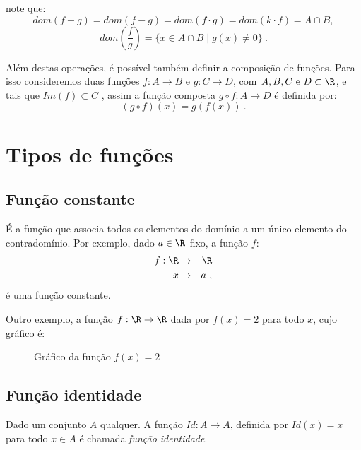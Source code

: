 note que:
\[dom(f+g)= dom(f-g)= dom(f \cdot g)= dom(k \cdot f)= A \cap B ,\]
\[ dom\left( \frac{f}{g} \right)= \{x \in A \cap B \mid g(x) \neq 0\} \ . \]

Além destas operações, é possível também definir a composição de funções. Para isso consideremos duas funções $f: A \rightarrow B$ e $g: C \rightarrow D$, com $A, B, C \text{ e } D \subset \R$, e tais que $Im(f) \subset C$ , assim a função composta $g \circ f: A \rightarrow D$ é definida por:
\[(g \circ f)(x)= g(f(x)) \ . \]

\section{Tipos de funções}

\subsection{Função constante}

É a função que associa todos os elementos do domínio a um único elemento do contradomínio. Por exemplo, dado $a \in \R$ fixo, a função $f$:
\begin{eqnarray*}
 f: \R & \rightarrow & \R \\
 x & \mapsto & a \ ,
\end{eqnarray*}
é uma função constante.

Outro exemplo, a função $f: \R \rightarrow \R$ dada por $f(x)= 2$ para todo $x$, cujo gráfico é:
\begin{figure}[H]
 \centering
    \caption{Gráfico da função $f(x)=2$}
  \end{figure}

\subsection{Função identidade}

Dado um conjunto $A$ qualquer. A função $Id: A \rightarrow A$, definida por $Id(x)= x$ para todo $x \in A$ é chamada \textit{função identidade}.

